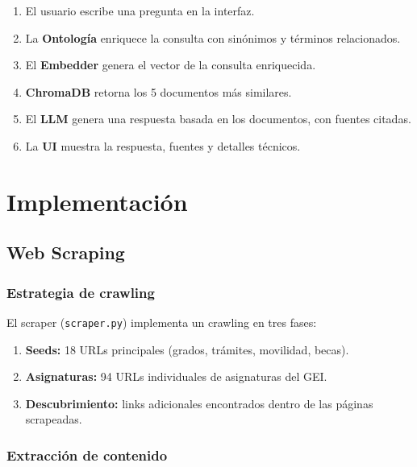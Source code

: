 \documentclass[12pt, a4paper, twoside]{report}
\begin{document}
\begin{enumerate}
  \item El usuario escribe una pregunta en la interfaz.
  \item La \textbf{Ontolog\'ia} enriquece la consulta con sin\'onimos y t\'erminos relacionados.
  \item El \textbf{Embedder} genera el vector de la consulta enriquecida.
  \item \textbf{ChromaDB} retorna los 5 documentos m\'as similares.
  \item El \textbf{LLM} genera una respuesta basada en los documentos, con fuentes citadas.
  \item La \textbf{UI} muestra la respuesta, fuentes y detalles t\'ecnicos.
\end{enumerate}


\chapter{Implementaci\'on}
\label{ch:implementacion}

\section{Web Scraping}

\subsection{Estrategia de crawling}

El scraper (\texttt{scraper.py}) implementa un crawling en tres fases:

\begin{enumerate}
  \item \textbf{Seeds:} 18 URLs principales (grados, tr\'amites, movilidad, becas).
  \item \textbf{Asignaturas:} 94 URLs individuales de asignaturas del GEI.
  \item \textbf{Descubrimiento:} links adicionales encontrados dentro de las p\'aginas scrapeadas.
\end{enumerate}

\subsection{Extracci\'on de contenido}
\end{document}
